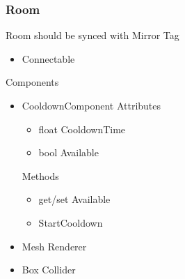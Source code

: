 \documentclass[11pt]{article}
\begin{document}
\subsubsection{Room}
Room should be synced with Mirror
\newline Tag
\begin{itemize}
	\item Connectable
\end{itemize}
Components
\begin{itemize}
	\item CooldownComponent
	\newline Attributes
	\begin{itemize}
		\item float CooldownTime
		\item bool Available
	\end{itemize}
	Methods
	\begin{itemize}
		\item get/set Available
		\item StartCooldown
	\end{itemize}
	\item Mesh Renderer
	\item Box Collider
\end{itemize}
\end{document}

